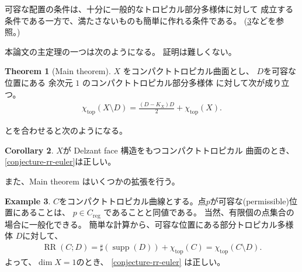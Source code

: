 \documentclass[a4paper,dvipdfmx,reqno,12pt]{amsart}
\theoremstyle{definition}
\newtheorem{theorem}{Theorem}[section]
\newtheorem{example}[theorem]{Example}
\newtheorem{corollary}[theorem]{Corollary}
\newcommand{\opn}[1]{\operatorname{#1}}
\numberwithin{equation}{section}
\begin{document}
可容な配置の条件は、十分に一般的なトロピカル部分多様体に対して
成立する条件である一方で、満たさないものも簡単に作れる条件である。
(\cref{example-permissible-point}などを参照。)

本論文の主定理の一つは次のようになる。
証明は難しくない。
\begin{theorem}[{Main theorem}]
\label{theorem-rr-euler-surface}
$X$ をコンパクトトロピカル曲面とし、
$D$を可容な位置にある
余次元 $1$ のコンパクトトロピカル部分多様体
に対して次が成り立つ。
\begin{align}
\chi_{\opn{top}}(X\setminus D)=\frac{(D-K_X)D}{2}+
\chi_{\opn{top}}(X).
\end{align}
\end{theorem}
\cite[Theorem 6.3]{demedrano2023chern}
とを合わせると次のようになる。
\begin{corollary}
$X$が Delzant face 構造をもつコンパクトトロピカル
曲面のとき、 \cref{conjecture-rr-euler}は正しい。
\end{corollary}

また、Main theorem はいくつかの拡張を行う。

\begin{example}
\label{example-permissible-point}
$C$をコンパクトトロピカル曲線とする。点$p$が可容な(permissible)位置にあることは、
$p\in C_{\opn{reg}}$ であることと同値である。
当然、有限個の点集合の場合に一般化できる。
簡単な計算から、可容な位置にある部分トロピカル多様体
$D$に対して、
\begin{align}
\opn{RR}(C;D)=\sharp (\opn{supp}(D))+ \chi_{\opn{top}}(C)
=\chi_{\opn{top}}(C\setminus D).
\end{align}
よって、$\dim X=1$のとき、
\cref{conjecture-rr-euler}
は正しい。
\end{example}
\end{document}
